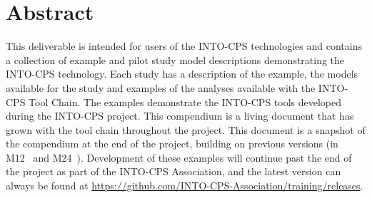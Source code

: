 \documentclass[narrowmargin,12pt,a4paper,final]{include/intocpsreport}   %
\begin{document}
\maketitle

\section*{Abstract}
\label{sec:abstract}

This deliverable is intended for users of the INTO-CPS technologies and contains a collection of example and pilot study model descriptions demonstrating the INTO-CPS technology. Each study has a description of the example, the models available for the study and examples of the analyses available with the INTO-CPS Tool Chain. The examples demonstrate the INTO-CPS tools developed during the INTO-CPS project. This compendium is a living document that has grown with the tool chain throughout the project. This document is a snapshot of the compendium at the end of the project, building on previous versions (in M12~\cite{INTOCPSD3.4} and M24~\cite{INTOCPSD3.5}). Development of these examples will continue past the end of the project as part of the INTO-CPS Association, and the latest version can always be found at \url{https://github.com/INTO-CPS-Association/training/releases}.

\newpage

\tableofcontents
\newpage


\clearpage

\clearpage

\clearpage

\clearpage

\clearpage

\clearpage

\clearpage

\clearpage

\clearpage

\clearpage

\clearpage

\newpage


\label{ch:bib} %
\end{document}
